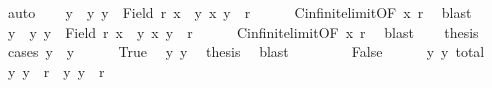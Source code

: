 \begin{isabellebody}
\ auto\isanewline
\ \ \isamarkupfalse%
\ y{}\ \ y{}{\isacharcolon}{\kern0pt}\ {\isachardoublequoteopen}y{}\ {\isasymin}\ Field\ r{\isachardoublequoteclose}\ {\isachardoublequoteopen}x{}\ {\isasymnoteq}\ y{}{\isachardoublequoteclose}\ {\isachardoublequoteopen}{\isacharparenleft}{\kern0pt}x{}{\isacharcomma}{\kern0pt}\ y{}{\isacharparenright}{\kern0pt}\ {\isasymin}\ r{\isachardoublequoteclose}\isanewline
\ \ \ \ \isamarkupfalse%
\ Cinfinite{\isacharunderscore}{\kern0pt}limit{\isacharbrackleft}{\kern0pt}OF\ x{}\ r{\isacharbrackright}{\kern0pt}\ \isamarkupfalse%
\ blast\isanewline
\ \ \isamarkupfalse%
\ y{}\ \ y{}{\isacharcolon}{\kern0pt}\ {\isachardoublequoteopen}y{}\ {\isasymin}\ Field\ r{\isachardoublequoteclose}\ {\isachardoublequoteopen}x{}\ {\isasymnoteq}\ y{}{\isachardoublequoteclose}\ {\isachardoublequoteopen}{\isacharparenleft}{\kern0pt}x{}{\isacharcomma}{\kern0pt}\ y{}{\isacharparenright}{\kern0pt}\ {\isasymin}\ r{\isachardoublequoteclose}\isanewline
\ \ \ \ \isamarkupfalse%
\ Cinfinite{\isacharunderscore}{\kern0pt}limit{\isacharbrackleft}{\kern0pt}OF\ x{}\ r{\isacharbrackright}{\kern0pt}\ \isamarkupfalse%
\ blast\isanewline
\ \ \isamarkupfalse%
\ {\isacharquery}{\kern0pt}thesis\isanewline
\ \ \isamarkupfalse%
\ {\isacharparenleft}{\kern0pt}cases\ {\isachardoublequoteopen}y{}\ {\isacharequal}{\kern0pt}\ y{}{\isachardoublequoteclose}{\isacharparenright}{\kern0pt}\isanewline
\ \ \ \ \isamarkupfalse%
\ True\ \isamarkupfalse%
\ y{}\ y{}\ \isamarkupfalse%
\ {\isacharquery}{\kern0pt}thesis\ \isamarkupfalse%
\ blast\isanewline
\ \ \isamarkupfalse%
\isanewline
\ \ \ \ \isamarkupfalse%
\ False\isanewline
\ \ \ \ \isamarkupfalse%
\ y{}{\isacharparenleft}{\kern0pt}{}{\isacharparenright}{\kern0pt}\ y{}{\isacharparenleft}{\kern0pt}{}{\isacharparenright}{\kern0pt}\ total\ \isamarkupfalse%
\ {\isachardoublequoteopen}{\isacharparenleft}{\kern0pt}y{}{\isacharcomma}{\kern0pt}\ y{}{\isacharparenright}{\kern0pt}\ {\isasymin}\ r\ {\isasymor}\ {\isacharparenleft}{\kern0pt}y{}{\isacharcomma}{\kern0pt}\ y{}{\isacharparenright}{\kern0pt}\ {\isasymin}\ r{\isachardoublequoteclose}\isanewline

\end{isabellebody}
